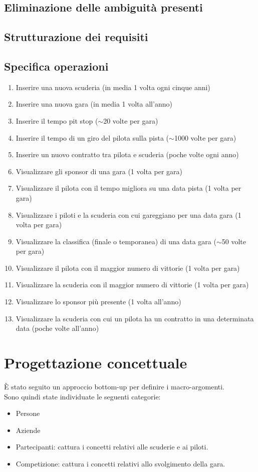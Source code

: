 \documentclass[11pt]{article}
\begin{document}
\subsection{Eliminazione delle ambiguità presenti}
\subsection{Strutturazione dei requisiti}
\subsection{Specifica operazioni}
\begin{enumerate}
    \item Inserire una nuova scuderia (in media 1 volta ogni cinque anni)
    \item Inserire una nuova gara (in media 1 volta all'anno)
    \item Inserire il tempo pit stop ($\sim$20 volte per gara)
    \item Inserire il tempo di un giro del pilota sulla pista ($\sim$1000 volte per gara)
    \item Inserire un nuovo contratto tra pilota e scuderia (poche volte ogni anno)
    \item Visualizzare gli sponsor di una gara (1 volta per gara)
    \item Visualizzare il pilota con il tempo migliora su una data pista (1 volta per gara)
    \item Visualizzare i piloti e la scuderia con cui gareggiano per una data gara (1 volta per gara)
    \item Visualizzare la classifica (finale o temporanea) di una data gara ($\sim$50 volte per gara)
    \item Visualizzare il pilota con il maggior numero di vittorie (1 volta per gara)
    \item Visualizzare la scuderia con il maggior numero di vittorie (1 volta per gara)
    \item Visualizzare lo sponsor più presente (1 volta all'anno)
    \item Visualizzare la scuderia con cui un pilota ha un contratto in una determinata data (poche volte all'anno)
\end{enumerate}

\section{Progettazione concettuale}
È stato seguito un approccio bottom-up per definire i macro-argomenti.\\
Sono quindi state individuate le seguenti categorie:
\begin{itemize}
    \item Persone
    \item Aziende
    \item Partecipanti: cattura i concetti relativi alle scuderie e ai piloti.
    \item Competizione: cattura i concetti relativi allo svolgimento della gara.
\end{itemize}
\end{document}
